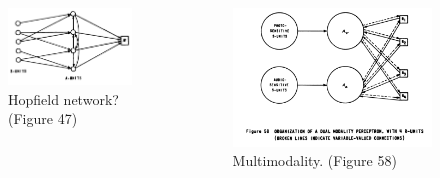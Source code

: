 \documentclass{beamer}
\begin{document}
\begin{frame}
\begin{columns}
    \begin{column}{0.5\textwidth}
    \begin{figure}[t]
        \includegraphics[width=\textwidth]{figure/Rosenlatt_Hopfield_network.png}
        \centering
        \caption{Hopfield network? (Figure 47)}
    \end{figure}
    \end{column}
    \begin{column}{0.5\textwidth}
        \begin{figure}[t]
            \includegraphics[width=\textwidth]{figure/Rosenblatt_multimodal.png}
            \centering
            \caption{Multimodality. (Figure 58)}
        \end{figure}
    \end{column}
\end{columns}
\end{frame}
\end{document}
